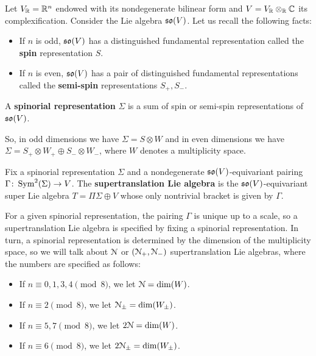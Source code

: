 \documentclass[10pt, oneside]{article}
\begin{document}
Let $V_\mathbb R = \mathbb R^n$ endowed with its nondegenerate bilinear form and $V=V_\mathbb R\otimes_\mathbb R\mathbb C$ its complexification. Consider the Lie algebra $\mathfrak{so}(V)$. Let us recall the following facts:
\begin{itemize}
\item If $n$ is odd, $\mathfrak{so}(V)$ has a distinguished fundamental representation called the {\bf spin} representation $S$.

\item If $n$ is even, $\mathfrak{so}(V)$ has a pair of distinguished fundamental representations called the {\bf semi-spin} representations $S_+, S_-$.
\end{itemize}

\begin{dfn}
A {\bf spinorial representation} $\Sigma$ is a sum of spin or semi-spin representations of $\mathfrak{so}(V)$.
\end{dfn}

So, in odd dimensions we have $\Sigma=S\otimes W$ and in even dimensions we have $\Sigma=S_+\otimes W_+\oplus S_-\otimes W_-$, where $W$ denotes a multiplicity space.

\begin{dfn}
Fix a spinorial representation $\Sigma$ and a nondegenerate $\mathfrak{so}(V)$-equivariant pairing $\Gamma\colon \operatorname{Sym}^2(\Sigma)\rightarrow V$. The {\bf supertranslation Lie algebra} is the $\mathfrak{so}(V)$-equivariant super Lie algebra $T=\Pi\Sigma\oplus V$ whose only nontrivial bracket is given by $\Gamma$.
\end{dfn}

For a given spinorial representation, the pairing $\Gamma$ is unique up to a scale, so a supertranslation Lie algebra is specified by fixing a spinorial representation. In turn, a spinorial representation is determined by the dimension of the multiplicity space, so we will talk about $\mathcal{N}$ or $(\mathcal{N}_+, \mathcal{N}_-)$ supertranslation Lie algebras, where the numbers are specified as follows:
\begin{itemize}
\item If $n\equiv 0, 1, 3, 4\pmod 8$, we let $\mathcal{N} = \dim(W)$.

\item If $n\equiv 2 \pmod 8$, we let $\mathcal{N}_{\pm}=\dim(W_{\pm})$.

\item If $n\equiv 5, 7\pmod 8$, we let $2\mathcal{N} = \dim(W)$.

\item If $n\equiv 6\pmod 8$, we let $2\mathcal{N}_{\pm} = \dim(W_{\pm})$.
\end{itemize}
\end{document}

